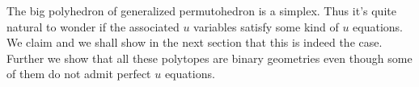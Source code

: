 \documentclass[hidelinks,12pt]{article}
\begin{document}
\vspace{1ex}

The big polyhedron of generalized permutohedron is a simplex. Thus it's quite natural to wonder if the associated $u$ variables satisfy some kind of $u$ equations. We claim and we shall show in the next section that this is indeed the case. Further we show that all these polytopes are binary geometries even though some of them do not admit perfect $u$ equations. 








\end{document}
